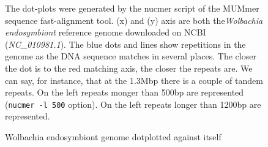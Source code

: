 \documentclass[12pt]{article}
\begin{document}
\begin{figure}[h!]
\begin{center}
{
}
\end{center}
\caption{Wolbachia endosymbiont genome dotplotted against itself}
{\footnotesize The dot-plots were generated by the nucmer script of the MUMmer sequence fast-alignment tool. (x) and (y) axis are both the\textit{Wolbachia endosymbiont} reference genome downloaded on NCBI 
(\textit{NC\_010981.1}). The blue dots and lines show repetitions in the genome as the DNA sequence matches in several places. The closer the dot is to the red matching axis, the closer the repeats are. We can say, for instance, that at the 1.3Mbp there is a couple of tandem repeats. On the left repeats monger than 500bp are represented (\texttt{nucmer -l 500} option). On the left repeats longer than 1200bp are represented.}
\label{fig:wolbarepeats}
\end{figure}
\newpage
\end{document}
